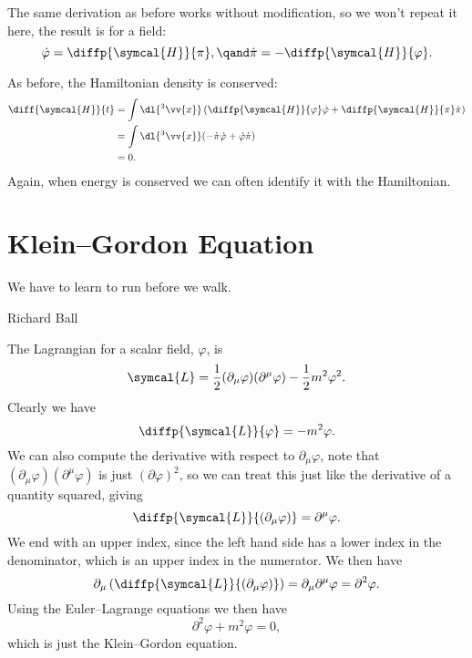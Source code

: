 \documentclass[fleqn]{NotesClass}
\newcommand{\dalembertian}{\partial^2}
\newcommand{\lagrangianDensity}{\symcal{L}}
\newcommand{\hamiltonianDensity}{\symcal{H}}
\begin{document}
    The same derivation as before works without modification, so we won't repeat it here, the result is  for a field:
    \begin{equation}
        \dot{\varphi} = \diffp{\hamiltonianDensity}{\pi}, \qand \dot{\pi} = - \diffp{\hamiltonianDensity}{\varphi}.
    \end{equation}
    
    As before, the Hamiltonian density is conserved:
    \begin{align}
        \diff{\hamiltonianDensity}{t} &= \int \dl{^3\vv{x}} \left( \diffp{\hamiltonianDensity}{\varphi} \dot{\varphi} + \diffp{\hamiltonianDensity}{\pi} \dot{\pi} \right)\\
        &= \int \dl{^3\vv{x}} (-\dot{\pi} \dot{\varphi} + \dot{\varphi} \dot{\pi})\\
        &= 0.
    \end{align}
    Again, when energy is conserved we can often identify it with the Hamiltonian.
    
    \section{Klein--Gordon Equation}
    \epigraph{We have to learn to run before we walk.}{Richard Ball}
    The Lagrangian for a scalar field, \(\varphi\), is
    \begin{equation}
        \lagrangianDensity = \frac{1}{2}(\partial_\mu \varphi)(\partial^\mu \varphi) - \frac{1}{2}m^2\varphi^2.
    \end{equation}
    Clearly we have
    \begin{equation}
        \diffp{\lagrangianDensity}{\varphi} = -m^2\varphi.
    \end{equation}
    We can also compute the derivative with respect to \(\partial_\mu \varphi\), note that \((\partial_\mu \varphi)(\partial^\mu \varphi)\) is just \((\partial \varphi)^2\), so we can treat this just like the derivative of a quantity squared, giving
    \begin{equation}
        \diffp{\lagrangianDensity}{(\partial_\mu \varphi)} = \partial^\mu \varphi.
    \end{equation}
    We end with an upper index, since the left hand side has a lower index in the denominator, which is an upper index in the numerator.
    We then have
    \begin{equation}
        \partial_\mu \left( \diffp{\lagrangianDensity}{(\partial_\mu \varphi)} \right) = \partial_\mu \partial^\mu \varphi = \dalembertian \varphi.
    \end{equation}
    Using the Euler--Lagrange equations we then have
    \begin{equation}
        \dalembertian \varphi + m^2 \varphi = 0,
    \end{equation}
    which is just the Klein--Gordon equation.
    
\end{document}
